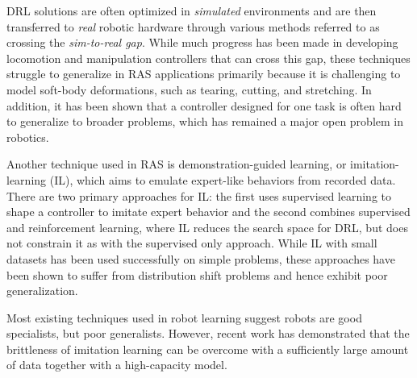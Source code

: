 \documentclass[fleqn,10pt]{wlscirep}\twocolumn
\begin{document}
DRL solutions are often optimized in \textit{simulated} environments and are then transferred to \textit{real} robotic hardware through various methods referred to as crossing the \textit{sim-to-real gap}.
While much progress has been made in developing locomotion\cite{lee2020learning,agarwal2023legged} and manipulation\cite{liu2021deep, zhao2023learning} controllers that can cross this gap, these techniques struggle to generalize in RAS applications primarily because it is challenging to model soft-body deformations, such as tearing, cutting, and stretching. 
In addition, it has been shown that a controller designed for one task is often hard to generalize to broader problems\cite{yip2019robot}, which has remained a major open problem in robotics\cite{zhang2018study}.


Another technique used in RAS is demonstration-guided learning\cite{van2010superhuman, hu2023model, huang2023guided}, or imitation-learning (IL), which aims to emulate expert-like behaviors from recorded data. 
There are two primary approaches for IL: the first uses supervised learning to shape a controller to imitate expert behavior and the second combines supervised and reinforcement learning, where IL reduces the search space for DRL, but does not constrain it as with the supervised only approach.
While IL with small datasets has been used successfully on simple problems, these approaches have been shown to suffer from distribution shift problems and hence exhibit poor generalization\cite{osa2018algorithmic, ibarz2021train}. 

Most existing techniques used in robot learning suggest robots are good specialists, but poor generalists.
However, recent work has demonstrated that the brittleness of imitation learning can be overcome with a sufficiently large amount of data together with a high-capacity model\cite{reed2022generalist, brohan2022rt, brohan2023rt, open_x_embodiment_rt_x_2023, hu2023Toward, octo_2023}. 
\end{document}
